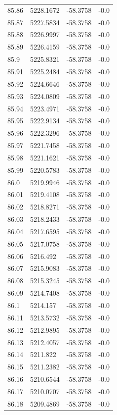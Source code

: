 \begin{table}[H]
\begin{tabular}{llll}
85.86 & 5228.1672 & -58.3758 & -0.0 \\
85.87 & 5227.5834 & -58.3758 & -0.0 \\
85.88 & 5226.9997 & -58.3758 & -0.0 \\
85.89 & 5226.4159 & -58.3758 & -0.0 \\
85.9 & 5225.8321 & -58.3758 & -0.0 \\
85.91 & 5225.2484 & -58.3758 & -0.0 \\
85.92 & 5224.6646 & -58.3758 & -0.0 \\
85.93 & 5224.0809 & -58.3758 & -0.0 \\
85.94 & 5223.4971 & -58.3758 & -0.0 \\
85.95 & 5222.9134 & -58.3758 & -0.0 \\
85.96 & 5222.3296 & -58.3758 & -0.0 \\
85.97 & 5221.7458 & -58.3758 & -0.0 \\
85.98 & 5221.1621 & -58.3758 & -0.0 \\
85.99 & 5220.5783 & -58.3758 & -0.0 \\
86.0 & 5219.9946 & -58.3758 & -0.0 \\
86.01 & 5219.4108 & -58.3758 & -0.0 \\
86.02 & 5218.8271 & -58.3758 & -0.0 \\
86.03 & 5218.2433 & -58.3758 & -0.0 \\
86.04 & 5217.6595 & -58.3758 & -0.0 \\
86.05 & 5217.0758 & -58.3758 & -0.0 \\
86.06 & 5216.492 & -58.3758 & -0.0 \\
86.07 & 5215.9083 & -58.3758 & -0.0 \\
86.08 & 5215.3245 & -58.3758 & -0.0 \\
86.09 & 5214.7408 & -58.3758 & -0.0 \\
86.1 & 5214.157 & -58.3758 & -0.0 \\
86.11 & 5213.5732 & -58.3758 & -0.0 \\
86.12 & 5212.9895 & -58.3758 & -0.0 \\
86.13 & 5212.4057 & -58.3758 & -0.0 \\
86.14 & 5211.822 & -58.3758 & -0.0 \\
86.15 & 5211.2382 & -58.3758 & -0.0 \\
86.16 & 5210.6544 & -58.3758 & -0.0 \\
86.17 & 5210.0707 & -58.3758 & -0.0 \\
86.18 & 5209.4869 & -58.3758 & -0.0 \\

\end{tabular}
\end{table}
